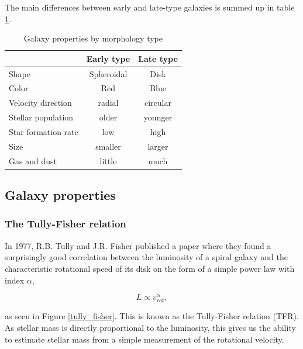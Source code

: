 The main differences between early and late-type galaxies is summed up in table \ref{morphologies}.

\begin{table}
\begin{center}
\caption{Galaxy properties by morphology type}
\label{morphologies}
\begin{tabular} { l| c c } 
 \hline
 \hline
  & Early type & Late type \\
 \hline
 Shape & Spheroidal & Disk \\
 Color & Red & Blue \\
 Velocity direction& radial & circular \\
 Stellar population & older & younger \\
 Star formation rate & low & high \\
 Size & smaller & larger \\
 Gas and dust & little & much \\
  
 \hline 
\end{tabular}
\end{center}
\end{table}

\subsection{Galaxy properties}

\subsubsection{The Tully-Fisher relation}

In 1977, R.B. Tully and J.R. Fisher \parencite{TullyFisher1977} published a paper where they found a surprisingly good correlation between the luminosity of a spiral galaxy and the characteristic rotational speed of its disk on the form of a simple power law with index $\alpha$,

\begin{equation}
    L \propto v_{rot}^\alpha,
\end{equation}

as seen in Figure \ref{tully_fisher}. This is known as the Tully-Fisher relation (TFR). As stellar mass is directly proportional to the luminosity, this gives us the ability to estimate stellar mass from a simple measurement of the rotational velocity.

